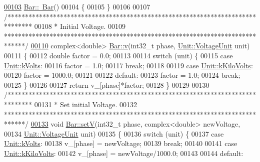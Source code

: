 \begin{DoxyCode}
\hypertarget{bar_8cpp_source_l00103}{}\hyperlink{group___models_ga9c7ebea0c189423591741ac438985316}{00103} \hyperlink{group___models_ga9c7ebea0c189423591741ac438985316}{Bar::~Bar}()
00104 \{
00105 \}
00106 
00107 \textcolor{comment}{/*******************************************************************************}
00108 \textcolor{comment}{ * Initial Voltage.}
00109 \textcolor{comment}{ ******************************************************************************/}
\hypertarget{bar_8cpp_source_l00110}{}\hyperlink{group___models_ga1e6f2daec86407118656d88170d1adc2}{00110} complex<double> \hyperlink{group___models_ga1e6f2daec86407118656d88170d1adc2}{Bar::v}(int32\_t phase, \hyperlink{class_unit_a55b07dfa9457e1eca2c7194fe0cfc3c1}{Unit::VoltageUnit} unit)
00111 \{
00112   \textcolor{keywordtype}{double} factor = 0.0;
00113 
00114   \textcolor{keywordflow}{switch} (unit) \{
00115   \textcolor{keywordflow}{case} \hyperlink{class_unit_a55b07dfa9457e1eca2c7194fe0cfc3c1aa54b2473993a702a3923525765bd6e4c}{Unit::kVolts}:
00116     factor = 1.0;
00117     \textcolor{keywordflow}{break};
00118 
00119   \textcolor{keywordflow}{case} \hyperlink{class_unit_a55b07dfa9457e1eca2c7194fe0cfc3c1a35a201a658c2cd89766787c657e9a54d}{Unit::kKiloVolts}:
00120     factor = 1000.0;
00121 
00122   \textcolor{keywordflow}{default}:
00123     factor = 1.0;
00124     \textcolor{keywordflow}{break};
00125   \}
00126 
00127   \textcolor{keywordflow}{return} v\_[phase]*factor;
00128 \}
00129 
00130 \textcolor{comment}{/*******************************************************************************}
00131 \textcolor{comment}{ * Set initial Voltage.}
00132 \textcolor{comment}{ ******************************************************************************/}
\hypertarget{bar_8cpp_source_l00133}{}\hyperlink{group___models_ga9b6fbc92674bfcdc9d5090795ab335a6}{00133} \textcolor{keywordtype}{void} \hyperlink{group___models_ga9b6fbc92674bfcdc9d5090795ab335a6}{Bar::setV}(int32\_t phase, complex<double> newVoltage,
00134                \hyperlink{class_unit_a55b07dfa9457e1eca2c7194fe0cfc3c1}{Unit::VoltageUnit} unit)
00135 \{
00136   \textcolor{keywordflow}{switch} (unit) \{
00137   \textcolor{keywordflow}{case} \hyperlink{class_unit_a55b07dfa9457e1eca2c7194fe0cfc3c1aa54b2473993a702a3923525765bd6e4c}{Unit::kVolts}:
00138     v\_[phase] = newVoltage;
00139     \textcolor{keywordflow}{break};
00140 
00141   \textcolor{keywordflow}{case} \hyperlink{class_unit_a55b07dfa9457e1eca2c7194fe0cfc3c1a35a201a658c2cd89766787c657e9a54d}{Unit::kKiloVolts}:
00142     v\_[phase] = newVoltage/1000.0;
00143 
00144   \textcolor{keywordflow}{default}:

\end{DoxyCode}
